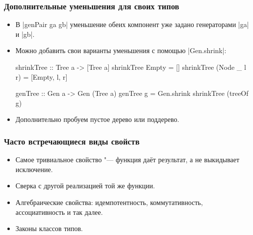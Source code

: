 \documentclass[11pt]{beamer}
\begin{document}
\begin{frame}[fragile]
  \frametitle{Дополнительные уменьшения для своих типов}
  \begin{itemize}
    \item В \haskinline|genPair ga gb| уменьшение обеих компонент уже задано генераторами \haskinline|ga| и \haskinline|gb|.
    \item Можно добавить свои варианты уменьшения с помощью \haskinline|Gen.shrink|:
          \begin{haskellsmall}
            shrinkTree :: Tree a -> [Tree a]
            shrinkTree Empty = []
            shrinkTree (Node _ l r) = [Empty, l, r]

            genTree :: Gen a -> Gen (Tree a)
            genTree g = Gen.shrink shrinkTree (treeOf g)
          \end{haskellsmall}
    \item Дополнительно пробуем пустое дерево или поддерево.
  \end{itemize}
\end{frame}

\begin{frame}[fragile]
  \frametitle{Часто встречающиеся виды свойств}
  \begin{itemize}
    \item Самое тривиальное свойство "--- функция даёт результат, а не выкидывает исключение.
    \item Сверка с другой реализацией той же функции.
    \item Алгебраические свойства: идемпотентность, коммутативность, ассоциативность и так далее.
    \item Законы классов типов.
  \end{itemize}
\end{frame}
\end{document}
